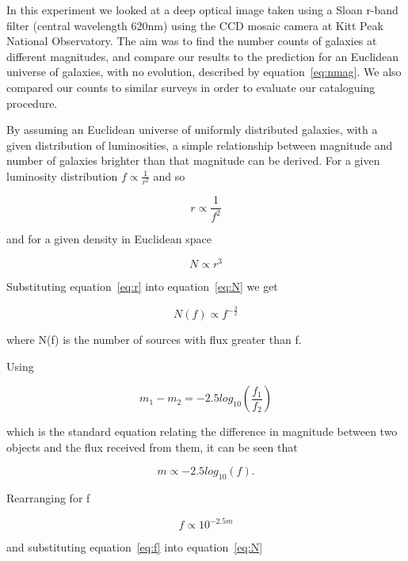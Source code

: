\documentclass[a4paper,11pt,twoside]{article}
\begin{document}
In this experiment we looked at a deep optical image taken using a 
Sloan r-band filter (central wavelength 620nm) using the CCD mosaic 
camera at Kitt Peak National Observatory. The aim was to find the 
number counts of galaxies at different magnitudes, and compare our 
results to the prediction for an Euclidean universe of galaxies, 
with no evolution, described by equation~\ref{eq:nmag}. We also 
compared our counts to similar surveys in order to evaluate our 
cataloguing procedure.

By assuming an Euclidean universe of uniformly distributed galaxies, 
with a given distribution of luminosities, a simple relationship 
between magnitude and number of galaxies brighter than that magnitude 
can be derived. For a given luminosity distribution
\(f \propto \frac{1}{r^2}\) and so

\begin{equation}
\label{eq:r}
r \propto \frac{1}{f^2}
\end{equation} 

and for a given density in Euclidean space

\begin{equation}
\label{eq:N}
N \propto r^3
\end{equation}

Substituting equation~\ref{eq:r} into equation~\ref{eq:N} we get

\begin{equation}
N(f) \propto f^{-\frac{3}{2}}
\end{equation}

where N(f) is the number of sources with flux greater than f.

Using

\begin{equation}
m_1 - m_2 = -2.5log_{10}(\frac{f_1}{f_2})
\end{equation}


which is the standard equation relating the difference in magnitude 
between two objects and the flux received from them, it can be seen that

\begin{equation}
m \propto -2.5log_{10}(f).
\end{equation}

Rearranging for f

\begin{equation}
\label{eq:f}
f \propto 10^{-2.5m}
\end{equation}

and substituting equation~\ref{eq:f} into equation~\ref{eq:N} 
\end{document}
